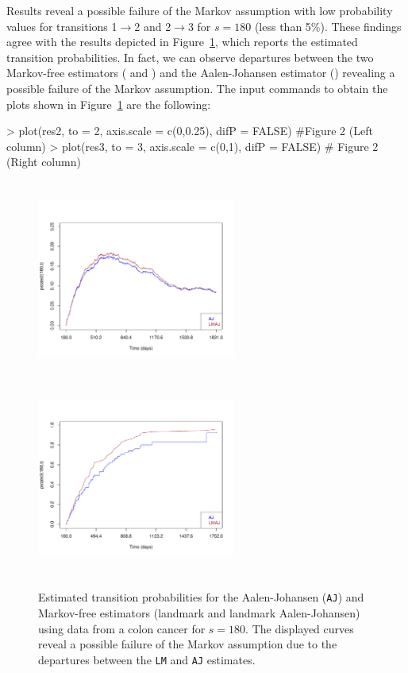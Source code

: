 Results reveal a possible failure of the Markov assumption with low probability values for transitions 1$\rightarrow$2 and 2$\rightarrow$3 for $s=180$ (less than 5\%). These findings agree with the results depicted in Figure~\ref{fig4}, which reports the estimated transition probabilities. In fact, we can observe departures between the two Markov-free estimators ( and ) and the Aalen-Johansen estimator () revealing a possible failure of the Markov assumption. The input commands to obtain the plots shown in Figure~\ref{fig4} are the following:

\begin{example}
> plot(res2, to = 2, axis.scale = c(0,0.25), difP = FALSE) #Figure 2 (Left column)
> plot(res3, to = 3, axis.scale = c(0,1), difP = FALSE) # Figure 2 (Right column)
\end{example}

 
\begin{figure} [t] %
\centering
\includegraphics[width=6.5cm, height=6.5cm]{colon/p12_180_t_new2.pdf}
\includegraphics[width=6.5cm, height=6.5cm]{colon/p23_180_t_new2.pdf}\\

\caption{\label{fig4} Estimated transition probabilities for the Aalen-Johansen (\texttt{AJ}) and Markov-free estimators (landmark and landmark Aalen-Johansen) using data from a colon cancer for  $s = 180$. The displayed curves reveal a possible failure of the Markov assumption due to the departures between the \texttt{LM} and \texttt{AJ} estimates.}
\end{figure}

